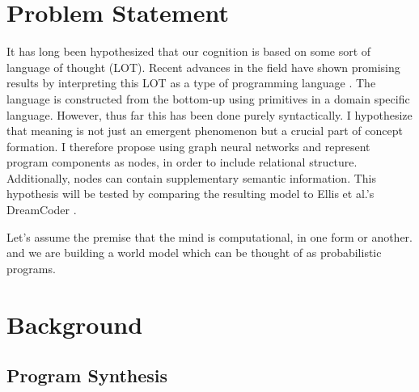 





\section{Problem Statement}
It has long been hypothesized that our cognition is based on some sort of language of thought (LOT). Recent advances in the field have shown promising results by interpreting this LOT as a type of programming language \cite{rule_child_2020, ellis_dreamcoder_2021, dehaene_symbols_2022}. The language is constructed from the bottom-up using primitives in a domain specific language. However, thus far this has been done purely syntactically. I hypothesize that meaning is not just an emergent phenomenon but a crucial part of concept formation. I therefore propose using graph neural networks and represent program components as nodes, in order to include relational structure. Additionally, nodes can contain supplementary semantic information. This hypothesis will be tested by comparing the resulting model to Ellis et al.'s DreamCoder \cite{ellis_dreamcoder_2021}.

Let's assume the premise that the mind is computational, in one form or another. 
and we are building a world model which can be thought of as probabilistic programs. 

\section{Background}

\subsection{Program Synthesis}

